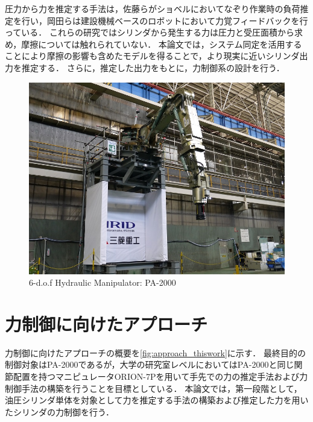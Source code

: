 圧力から力を推定する手法は，佐藤ら\cite{佐藤有香理2015油圧ショベルにおけるバケット先端の負荷力推定}がショベルにおいてなぞり作業時の負荷推定を行い，岡田ら\cite{岡田大貴2016多自由度油圧駆動ロボットのシリンダ圧に基づく手先負荷力推定,岡田大貴2017多自由度油圧駆動ロボットのシリンダ圧に基づく手先負荷力推定による力覚フィードバック}は建設機械ベースのロボットにおいて力覚フィードバックを行っている．
これらの研究ではシリンダから発生する力は圧力と受圧面積から求め，摩擦については触れられていない．
本論文では，システム同定を活用することにより摩擦の影響も含めたモデルを得ることで，より現実に近いシリンダ出力を推定する．
さらに，推定した出力をもとに，力制御系の設計を行う．

\begin{figure}[t]
    \centering
        \includegraphics[keepaspectratio, width = .8\linewidth]{contents/緒言/figure/PA-2000.jpg}
        \caption{6-d.o.f Hydraulic Manipulator: PA-2000}
        \label{fig:PA-2000}
\end{figure}

\section{力制御に向けたアプローチ}
力制御に向けたアプローチの概要を\figname\ref{fig:approach_thiswork}に示す．
最終目的の制御対象はPA-2000であるが，大学の研究室レベルにおいてはPA-2000と同じ関節配置を持つマニピュレータORION-7Pを用いて手先での力の推定手法および力制御手法の構築を行うことを目標としている．
本論文では，第一段階として，油圧シリンダ単体を対象として力を推定する手法の構築および推定した力を用いたシリンダの力制御を行う．


